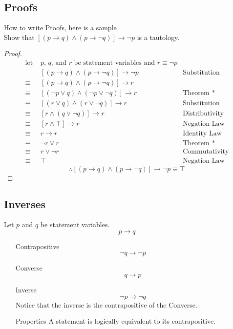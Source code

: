 \documentclass[12pt]{book}
\newcommand{\T}[0]{\top}
\begin{document}
\subsection{Proofs}
How to write Proofs, here is a sample\\
Show that $[(p \rightarrow q) \wedge (p \rightarrow \neg q)] \rightarrow \neg p$ is a tautology.
\begin{proof}
    \begin{align*}
        \text{let } & \text{$p$, $q$, and $r$ be statement variables and $r \equiv \neg p$}\\
        & [(p \rightarrow q) \wedge (p \rightarrow \neg q)] \rightarrow \neg p & \text{Substitution} \\
        \equiv &  [(p \rightarrow q) \wedge (p \rightarrow \neg q)] \rightarrow r \\
        \equiv & [(\neg p \vee q) \wedge (\neg p \vee \neg q)] \rightarrow r & \text{Theorem *}\\
        \equiv & [(r \vee q) \wedge (r \vee \neg q)] \rightarrow r & \text{Substitution} \\
        \equiv & [ r \wedge (q \vee \neg q )] \rightarrow r & \text{Distributivity}\\
        \equiv & [r \wedge \T ] \rightarrow r & \text{Negation Law}\\
        \equiv & r \rightarrow r & \text{Identity Law}\\
        \equiv & \neg r \vee r & \text{Theorem *}\\
        \equiv &  r \vee \neg r & \text{Commutativity}\\
        \equiv & \T & \text{Negation Law}
    \end{align*}
    \[
    \therefore [(p \rightarrow q) \wedge (p \rightarrow \neg q)] \rightarrow \neg p \equiv \T
    \]
\end{proof}

\subsection{Inverses}
Let $p$ and $q$ be statement variables. 
    \[
    p \rightarrow q
    \]
\begin{enumerate}
    \item[Contrapositive] 
    \[
    \neg q \rightarrow \neg p
    \]
    \item[Converse]
    \[
    q \rightarrow p
    \]
    \item[Inverse]
    \[
    \neg p \rightarrow \neg q
    \]
    Notice that the inverse is the contrapositive of the Converse.
    \item[Properties] A statement is logically equivalent to its contrapositive.

\end{enumerate}
\end{document}
